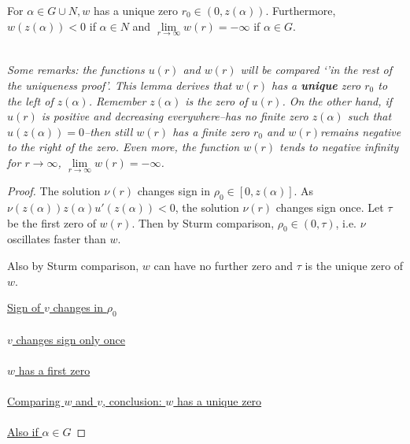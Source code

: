 \begin{lemma}\label{wq}For $\alpha\in G\cup N,w$ has a unique zero $r_0\in(0,z(\alpha)).$ Furthermore, $w(z(\alpha))<0$ if $\alpha\in N$ and $\underset{r\to\infty}{\lim}w(r)=-\infty$ if $\alpha\in G$.

\emph{}\\[11pt]\emph{Some remarks: the functions $u(r)$ and $w(r)$ will be compared `'in the rest of the uniqueness proof'. This lemma derives that $w(r)$ has a \textbf{unique} zero $r_0$ to the left of $z(\alpha)$. Remember $z(\alpha)$ is the zero of $u(r)$. On the other hand, if $u(r)$ is positive and decreasing everywhere--has no finite zero $z(\alpha)$ such that $u(z(\alpha))=0$--then still $w(r)$ has a finite zero $r_0$ and $w(r)$remains negative to the right of the zero. Even more, the function $w(r)$ tends to negative infinity for $r\to\infty$, $\underset{r\to\infty}{\lim}w(r)=-\infty$.}\\[11pt]
\begin{proof}
The solution $\nu(r)$ changes sign in $\rho_0\in[0,z(\alpha)]$. As $\nu(z(\alpha))z(\alpha)u'(z(\alpha))<0$, the solution $\nu(r)$ changes sign once. Let $\tau$ be the first zero of $w(r)$. Then by Sturm comparison, $\rho_0\in(0,\tau)$, i.e. $\nu$ oscillates faster than $w$.

Also by Sturm comparison, $w$ can have no further zero and $\tau$ is the unique zero of $w$.

\underline{Sign of $v$ changes in $\rho_0$} \\ \\

\underline{$v$ changes sign only once} \\ \\

\underline{$w$ has a first zero} \\ \\

\underline{Comparing $w$ and $v$, conclusion: $w$ has a unique zero} \\ \\

\underline{Also if $\alpha\in G$}


\end{proof}
\end{lemma}
